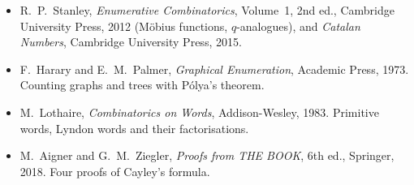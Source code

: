 \begin{itemize}
\item R.~P.~Stanley, \emph{Enumerative Combinatorics}, Volume~1, 2nd ed., Cambridge University Press, 2012 (M\"obius functions,
$q$-analogues), and \emph{Catalan Numbers}, Cambridge University Press, 2015.
\item F.~Harary and E.~M.~Palmer, \emph{Graphical Enumeration}, Academic Press, 1973. Counting graphs and trees with P\'olya's
theorem.
\item M.~Lothaire, \emph{Combinatorics on Words}, Addison-Wesley, 1983. Primitive words, Lyndon words and their factorisations.
\item M.~Aigner and G.~M.~Ziegler, \emph{Proofs from THE BOOK}, 6th ed., Springer, 2018. Four proofs of Cayley's formula.
\end{itemize}
